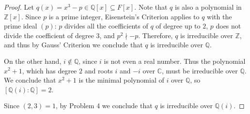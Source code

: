 \documentclass[11pt]{article}
\newcommand{\C}{\mathbb{C}}
\newcommand{\Q}{\mathbb{Q}}
\newcommand{\Z}{\mathbb{Z}}
\theoremstyle{definition}
\begin{document}
\begin{proof}
Let $q(x)= x^3-p \in \Q[x] \subseteq F[x]$. Note that $q$ is also a polynomial in $\Z[x]$. Since $p$ is a prime integer, Eisenstein's Criterion applies to $q$ with the prime ideal $(p)$: $p$ divides all the coefficients of $q$ of degree up to $2$, $p$ does not divide the coefficient of degree $3$, and $p^2 \nmid -p$. Therefore, $q$ is irreducible over $\Z$, and thus by Gauss' Criterion we conclude that $q$ is irreducible over $\Q$.

On the other hand, $i \notin \Q$, since $i$ is not even a real number. Thus the polynomial $x^2+1$, which has degree $2$ and roots $i$ and $-i$ over $\C$, must be irreducible over $\Q$. We conclude that $x^2+1$ is the minimal polynomial of $i$ over $\Q$, so $[\Q(i) : \Q] = 2$. 

Since $(2,3) = 1$, by Problem 4 we conclude that $q$ is irreducible over $\Q(i)$.
\end{proof}
\end{document}
